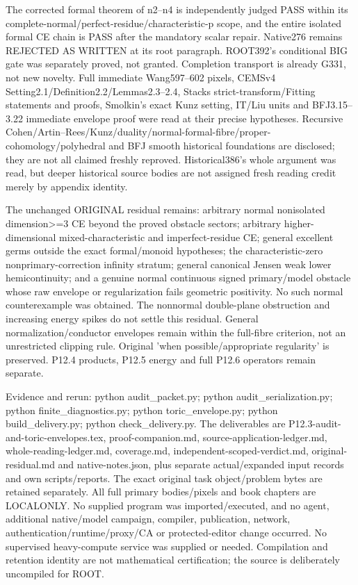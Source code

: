 \documentclass[11pt]{article}
\begin{document}
The corrected formal theorem of n2--n4 is independently judged PASS within its complete-normal/perfect-residue/characteristic-p scope, and the entire isolated formal CE chain is PASS after the mandatory scalar repair. Native276 remains REJECTED AS WRITTEN at its root paragraph. ROOT392's conditional BIG gate was separately proved, not granted. Completion transport is already G331, not new novelty. Full immediate Wang597--602 pixels, CEMSv4 Setting2.1/Definition2.2/Lemmas2.3--2.4, Stacks strict-transform/Fitting statements and proofs, Smolkin's exact Kunz setting, IT/Liu units and BFJ3.15--3.22 immediate envelope proof were read at their precise hypotheses. Recursive Cohen/Artin--Rees/Kunz/duality/normal-formal-fibre/proper-cohomology/polyhedral and BFJ smooth historical foundations are disclosed; they are not all claimed freshly reproved. Historical386's whole argument was read, but deeper historical source bodies are not assigned fresh reading credit merely by appendix identity.

The unchanged ORIGINAL residual remains: arbitrary normal nonisolated dimension>=3 CE beyond the proved obstacle sectors; arbitrary higher-dimensional mixed-characteristic and imperfect-residue CE; general excellent germs outside the exact formal/monoid hypotheses; the characteristic-zero nonprimary-correction infinity stratum; general canonical Jensen weak lower hemicontinuity; and a genuine normal continuous signed primary/model obstacle whose raw envelope or regularization fails geometric positivity. No such normal counterexample was obtained. The nonnormal double-plane obstruction and increasing energy spikes do not settle this residual. General normalization/conductor envelopes remain within the full-fibre criterion, not an unrestricted clipping rule. Original 'when possible/appropriate regularity' is preserved. P12.4 products, P12.5 energy and full P12.6 operators remain separate.

Evidence and rerun: python audit\_packet.py; python audit\_serialization.py; python finite\_diagnostics.py; python toric\_envelope.py; python build\_delivery.py; python check\_delivery.py. The deliverables are P12.3-audit-and-toric-envelopes.tex, proof-companion.md, source-application-ledger.md, whole-reading-ledger.md, coverage.md, independent-scoped-verdict.md, original-residual.md and native-notes.json, plus separate actual/expanded input records and own scripts/reports. The exact original task object/problem bytes are retained separately. All full primary bodies/pixels and book chapters are LOCALONLY. No supplied program was imported/executed, and no agent, additional native/model campaign, compiler, publication, network, authentication/runtime/proxy/CA or protected-editor change occurred. No supervised heavy-compute service was supplied or needed. Compilation and retention identity are not mathematical certification; the source is deliberately uncompiled for ROOT.
\end{document}
